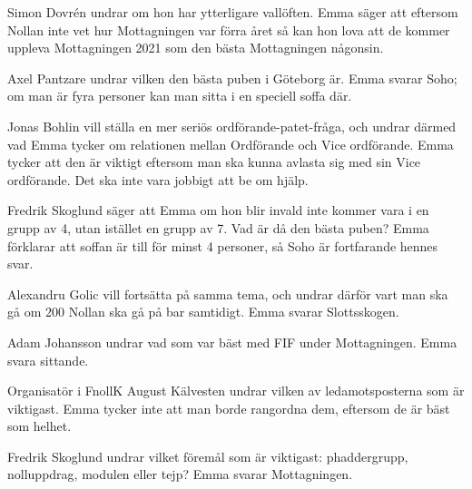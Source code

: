 \documentclass[hidelinks]{sektionsmote} %
\begin{document}
Simon Dovrén undrar om hon har ytterligare vallöften.
Emma säger att eftersom Nollan inte vet hur Mottagningen var förra året så kan hon lova att de kommer uppleva Mottagningen 2021 som den bästa Mottagningen någonsin.\par
Axel Pantzare undrar vilken den bästa puben i Göteborg är.
Emma svarar Soho; om man är fyra personer kan man sitta i en speciell soffa där.\par
Jonas Bohlin vill ställa en mer seriös ordförande-patet-fråga, och undrar därmed vad Emma tycker om relationen mellan Ordförande och Vice ordförande.
Emma tycker att den är viktigt eftersom man ska kunna avlasta sig med sin Vice ordförande.
Det ska inte vara jobbigt att be om hjälp.\par
Fredrik Skoglund säger att Emma om hon blir invald inte kommer vara i en grupp av 4, utan istället en grupp av 7.
Vad är då den bästa puben?
Emma förklarar att soffan är till för minst 4 personer, så Soho är fortfarande hennes svar.\par
Alexandru Golic vill fortsätta på samma tema, och undrar därför vart man ska gå om 200 Nollan ska gå på bar samtidigt.
Emma svarar Slottsskogen.\par
Adam Johansson undrar vad som var bäst med FIF under Mottagningen.
Emma svara sittande.\par
Organisatör i FnollK August Kälvesten undrar vilken av ledamotsposterna som är viktigast.
Emma tycker inte att man borde rangordna dem, eftersom de är bäst som helhet.\par
Fredrik Skoglund undrar vilket föremål som är viktigast: phaddergrupp, nolluppdrag, modulen eller tejp?
Emma svarar Mottagningen.
\end{document}
